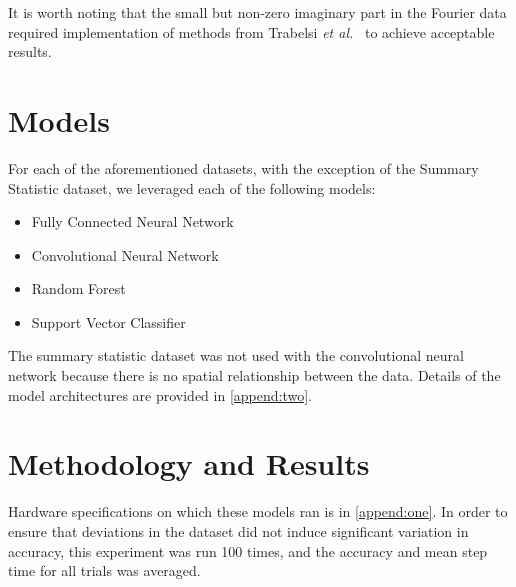 \renewcommand{\thefootnote}{1}
It is worth noting that the small but non-zero imaginary part in the Fourier data required implementation of methods from Trabelsi \textit{et al.}~\cite{trabelsi2017deep} to achieve acceptable results.

\section{Models}
For each of the aforementioned datasets, with the exception of the Summary Statistic dataset, we leveraged each of the following models:
\begin{itemize}
\item Fully Connected Neural Network
\item Convolutional Neural Network
\item Random Forest
\item Support Vector Classifier	
\end{itemize}

The summary statistic dataset was not used with the convolutional neural network because there is no spatial relationship between the data.
Details of the model architectures are provided in \ref{append:two}.

\section{Methodology and Results}
Hardware specifications on which these models ran is in \ref{append:one}.
In order to ensure that deviations in the dataset did not induce significant variation in accuracy, this experiment was run 100 times, and the accuracy and mean step time for all trials was averaged.

